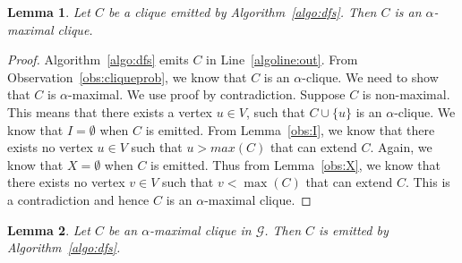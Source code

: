 \documentclass[11pt,letterpaper]{article}
\newtheorem{lemma}{Lemma}
\newcommand{\ugraph}{\mathcal{G}}
\begin{document}
\begin{lemma}
\label{lemma:correctness1}
Let $C$ be a clique emitted by Algorithm~\ref{algo:dfs}. Then $C$ is an $\alpha$-maximal clique. 
\end{lemma}

\begin{proof}
Algorithm~\ref{algo:dfs} emits $C$ in Line~\ref{algoline:out}.
From Observation~\ref{obs:cliqueprob}, we know that $C$ is an $\alpha$-clique. We need to show that $C$ is $\alpha$-maximal. We use proof by contradiction. Suppose $C$ is non-maximal. This means that there exists a vertex $u \in V$, such that  $C \cup \{u\}$ is an $\alpha$-clique. We know that $I = \emptyset$ when $C$ is emitted. From Lemma~\ref{obs:I}, we know that there exists no vertex $u \in V$ such that $u > max(C)$ that can extend $C$. Again, we know that $X = \emptyset$ when $C$ is emitted. Thus from Lemma~\ref{obs:X}, we know that there exists no vertex $v \in V$ such that $v < \max(C)$ that can extend $C$. This is a contradiction and hence $C$ is an $\alpha$-maximal clique. 
\end{proof}

\begin{lemma}
\label{lemma:correctness2}
Let $C$ be an $\alpha$-maximal clique in $\ugraph$. Then $C$ is emitted by Algorithm~\ref{algo:dfs}.
\end{lemma}
\end{document}
